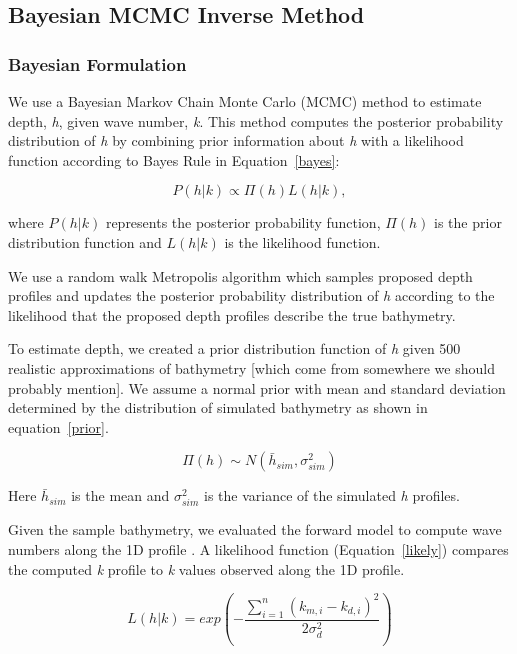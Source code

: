 \subsection{Bayesian MCMC Inverse Method}
\subsubsection{Bayesian Formulation}

We use a Bayesian Markov Chain Monte Carlo (MCMC) method to estimate depth, \textit{h}, given wave number, \textit{k}. %
This method computes the posterior probability distribution of \textit{h} by combining prior information about \textit{h} with a likelihood function according to Bayes Rule in Equation~\ref{bayes}: 


\begin{equation}\label{bayes}
P(h|%
k) \propto \Pi(h)L(h|%
k),
\end{equation} 

where $P(h|%
k)$ represents the posterior probability function, $\Pi(h)$ is the prior distribution function and $L(h|%
k)$ is the likelihood function.

We use a random walk Metropolis algorithm \citep{Metropolis1953} which samples proposed depth profiles and updates the posterior probability distribution of \textit{h} according to the likelihood that the proposed depth profiles describe the true bathymetry. 

To estimate depth, we created a prior distribution function of \textit{h} given 500 realistic approximations of bathymetry [which come from somewhere we should probably mention].  We assume a normal prior with mean and standard deviation determined by the distribution of simulated bathymetry as shown in equation~\ref{prior}. 

\begin{equation}\label{prior}
\Pi(h) \sim N(\bar{h}_{sim},\sigma_{sim}^2)
\end{equation}

Here $\bar{h}_{sim}$ is the mean and $\sigma_{sim}^2$ is the variance of the simulated \textit{h} profiles. 

Given the sample bathymetry, we evaluated the forward model to compute wave numbers along the 1D profile%
. A likelihood function (Equation~\ref{likely}) compares the computed \textit{k} profile to \textit{k} values observed along the 1D profile. 

\begin{equation} \label{likely}
L(h|%
k)=exp(- \frac{\sum\limits_{i=1}^n({k}_{m,i}-k_{d,i})^2}{2\sigma_{d}^2})
\end{equation} 

